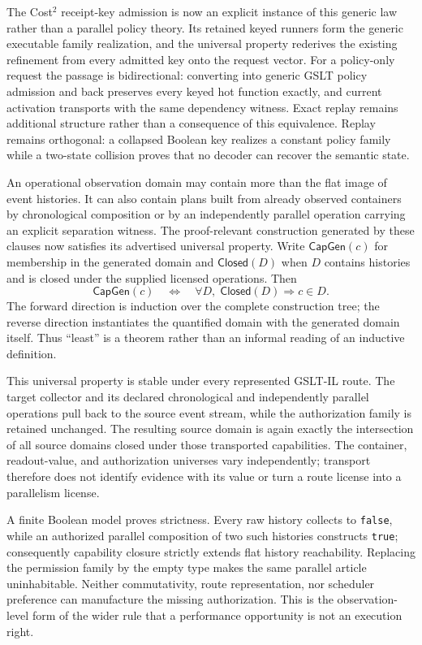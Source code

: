 \documentclass[11pt]{article}
\newcommand{\code}[1]{\texttt{#1}}
\begin{document}
The Cost$^2$ receipt-key admission is now an explicit instance of this generic
law rather than a parallel policy theory.  Its retained keyed runners form the
generic executable family realization, and the universal property rederives
the existing refinement from every admitted key onto the request vector.
For a policy-only request the passage is bidirectional: converting into generic
GSLT policy admission and back preserves every keyed hot function exactly, and
current activation transports with the same dependency witness.  Exact replay
remains additional structure rather than a consequence of this equivalence.
Replay remains orthogonal: a collapsed Boolean key realizes a constant policy
family while a two-state collision proves that no decoder can recover the
semantic state.

An operational observation domain may contain more than the flat image of event
histories.  It can also contain plans built from already observed containers by
chronological composition or by an independently parallel operation carrying an
explicit separation witness.  The proof-relevant construction generated by
these clauses now satisfies its advertised universal property.  Write
$\mathsf{CapGen}(c)$ for membership in the generated domain and
$\mathsf{Closed}(D)$ when $D$ contains histories and is closed under the
supplied licensed operations.  Then
\[
 \mathsf{CapGen}(c)
 \quad\Longleftrightarrow\quad
 \forall D,\; \mathsf{Closed}(D) \Rightarrow c\in D.
\]
The forward direction is induction over the complete construction tree; the
reverse direction instantiates the quantified domain with the generated domain
itself.  Thus ``least'' is a theorem rather than an informal reading of an
inductive definition.

This universal property is stable under every represented GSLT-IL route.  The
target collector and its declared chronological and independently parallel
operations pull back to the source event stream, while the authorization family
is retained unchanged.  The resulting source domain is again exactly the
intersection of all source domains closed under those transported capabilities.
The container, readout-value, and authorization universes vary independently;
transport therefore does not identify evidence with its value or turn a route
license into a parallelism license.

A finite Boolean model proves strictness.  Every raw history collects to
\code{false}, while an authorized parallel composition of two such histories
constructs \code{true}; consequently capability closure strictly extends flat
history reachability.  Replacing the permission family by the empty type makes
the same parallel article uninhabitable.  Neither commutativity, route
representation, nor scheduler preference can manufacture the missing
authorization.  This is the observation-level form of the wider rule that a
performance opportunity is not an execution right.
\end{document}
